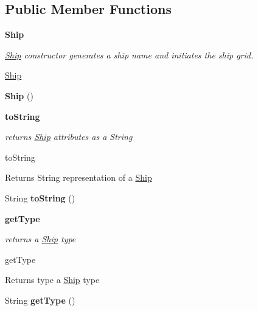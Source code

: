 \subsection*{Public Member Functions}
\begin{Indent}{\bf Ship}\par
{\em \hyperlink{classbattleship_1_1ships_1_1Ship}{Ship} constructor generates a ship name and initiates the ship grid.

\hyperlink{classbattleship_1_1ships_1_1Ship}{Ship} }\begin{DoxyCompactItemize}
\item 
\hypertarget{classbattleship_1_1ships_1_1Ship_aec78a89af91cbcf3e78fb0faa82845d9}{}{\bfseries Ship} ()\label{classbattleship_1_1ships_1_1Ship_aec78a89af91cbcf3e78fb0faa82845d9}

\end{DoxyCompactItemize}
\end{Indent}
\begin{Indent}{\bf to\+String}\par
{\em returns \hyperlink{classbattleship_1_1ships_1_1Ship}{Ship} attributes as a String

to\+String

\begin{DoxyReturn}{Returns}
String representation of a \hyperlink{classbattleship_1_1ships_1_1Ship}{Ship} 
\end{DoxyReturn}
}\begin{DoxyCompactItemize}
\item 
\hypertarget{classbattleship_1_1ships_1_1Ship_a13fa227fb24bc9cfc680970deafd24a0}{}String {\bfseries to\+String} ()\label{classbattleship_1_1ships_1_1Ship_a13fa227fb24bc9cfc680970deafd24a0}

\end{DoxyCompactItemize}
\end{Indent}
\begin{Indent}{\bf get\+Type}\par
{\em returns a \hyperlink{classbattleship_1_1ships_1_1Ship}{Ship} type

get\+Type

\begin{DoxyReturn}{Returns}
type a \hyperlink{classbattleship_1_1ships_1_1Ship}{Ship} type 
\end{DoxyReturn}
}\begin{DoxyCompactItemize}
\item 
\hypertarget{classbattleship_1_1ships_1_1Ship_a5fb79633a90f1c41c3f2581e6583f5d3}{}String {\bfseries get\+Type} ()\label{classbattleship_1_1ships_1_1Ship_a5fb79633a90f1c41c3f2581e6583f5d3}

\end{DoxyCompactItemize}
\end{Indent}
